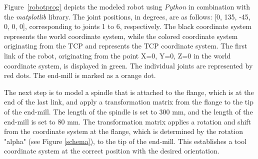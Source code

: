 Figure~\ref{robotprog} depicts the modeled robot using \textit{Python} in combination with the \textit{matplotlib} library. The joint positions, in degrees, are as follows: [0, 135, -45, 0, 0, 0], corresponding to joints 1 to 6, respectively. 
The black coordinate system represents the world coordinate system, while the colored coordinate system originating from the \acrshort{TCP} and represents the \acrshort{TCP} coordinate system.
The first link of the robot, originating from the point X=0, Y=0, Z=0 in the world coordinate system, is displayed in green. The individual joints are represented by red dots. The end-mill is marked as a orange dot.


The next step is to model a spindle that is attached to the flange, which is at the end of the last link, and apply a transformation matrix from the flange to the tip of the end-mill. The length of the spindle is set to 300 mm, and the length of the end-mill is set to 80 mm. The transformation matrix applies a rotation and shift from the coordinate system at the flange, which is determined by the rotation "alpha" (see Figure \ref{schema}), to the tip of the end-mill. This establishes a tool coordinate system at the correct position with the desired orientation.




